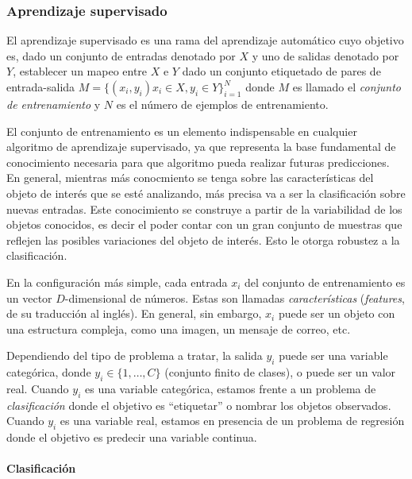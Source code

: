 	

	
	\subsubsection{Aprendizaje supervisado}
	
	El aprendizaje supervisado es una rama del aprendizaje automático cuyo objetivo es, dado un conjunto de entradas denotado por $X$ y uno de salidas denotado por $Y$, establecer un mapeo entre $X$ e $Y$ dado un conjunto etiquetado de pares de entrada-salida $M=\{(x_i,y_i) x_i \in X, y_i \in Y \}^{N}_{i=1}$ donde $M$ es llamado el \textit{conjunto de entrenamiento} y $N$ es el número de ejemplos de entrenamiento.
	
	El conjunto de entrenamiento es un elemento indispensable en cualquier algoritmo de aprendizaje supervisado, ya que representa la base fundamental de conocimiento necesaria para que algoritmo pueda realizar futuras predicciones. En general, mientras más conocmiento se tenga sobre las características del objeto de interés que se esté analizando, más precisa va a ser la clasificación sobre nuevas entradas. Este conocimiento se construye a partir de la variabilidad de los objetos conocidos, es decir el poder contar con un gran conjunto de muestras que reflejen las posibles variaciones del objeto de interés. Esto le otorga robustez a la clasificación.
	
	En la configuración más simple, cada entrada $x_i$ del conjunto de entrenamiento es un vector $D$-dimensional de números. Estas son llamadas \textit{características} (\textit{features}, de su traducción al inglés). En general, sin embargo, $x_i$ puede ser un objeto con una estructura compleja, como una imagen, un mensaje de correo, etc.
	
	Dependiendo del tipo de problema a tratar, la salida $y_i$ puede ser una variable categórica, donde $y_i \in \{1,\dots,C\}$ (conjunto finito de clases), o puede ser un valor real. Cuando $y_i$ es una variable categórica, estamos frente a un problema de \textit{clasificación} donde el objetivo es ``etiquetar'' o nombrar los objetos observados. Cuando $y_i$ es una variable real, estamos en presencia de un problema de regresión donde el objetivo es predecir una variable continua.
	
	
	\paragraph{Clasificación}  ~\\
	
